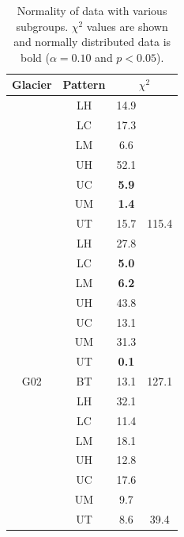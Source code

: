 \documentclass[12pt]{article}
\begin{document}
\begin{table}
\centering
\caption{Normality of data with various subgroups. $\chi^2$ values are shown and normally distributed data is bold ($\alpha=0.10$ and $p<0.05$).}
\label{tab:normality}
\begin{tabular}{cccc}
\textbf{Glacier} & \textbf{Pattern} & \multicolumn{2}{c}{\textbf{$\chi^2$}} \\ 
\hline
\hline
\rowcolor[HTML]{EFEFEF} 
\cellcolor[HTML]{EFEFEF} & LH & 14.9 & \cellcolor[HTML]{EFEFEF} \\
\rowcolor[HTML]{EFEFEF} 
\cellcolor[HTML]{EFEFEF} & LC & 17.3 & \cellcolor[HTML]{EFEFEF} \\
\rowcolor[HTML]{EFEFEF} 
\cellcolor[HTML]{EFEFEF} & LM & 6.6 & \cellcolor[HTML]{EFEFEF} \\
\rowcolor[HTML]{EFEFEF} 
\cellcolor[HTML]{EFEFEF} & UH & 52.1 & \cellcolor[HTML]{EFEFEF} \\
\rowcolor[HTML]{EFEFEF} 
\cellcolor[HTML]{EFEFEF} & UC & \textbf{5.9} & \cellcolor[HTML]{EFEFEF} \\
\rowcolor[HTML]{EFEFEF} 
\cellcolor[HTML]{EFEFEF} & UM & \textbf{1.4} & \cellcolor[HTML]{EFEFEF} \\
\rowcolor[HTML]{EFEFEF} 
\multirow{-7}{*}{\cellcolor[HTML]{EFEFEF}G04} & UT & 15.7 & \multirow{-7}{*}{\cellcolor[HTML]{EFEFEF}115.4} \\
 & LH & 27.8 &  \\
 & LC & \textbf{5.0} &  \\
 & LM & \textbf{6.2} &  \\
 & UH & 43.8 &  \\
 & UC & 13.1 &  \\
 & UM & 31.3 &  \\
 & UT & \textbf{0.1} &  \\
\multirow{-8}{*}{G02} & BT & 13.1 & \multirow{-8}{*}{127.1} \\
\rowcolor[HTML]{EFEFEF} 
\cellcolor[HTML]{EFEFEF} & LH & 32.1 & \cellcolor[HTML]{EFEFEF} \\
\rowcolor[HTML]{EFEFEF} 
\cellcolor[HTML]{EFEFEF} & LC & 11.4 & \cellcolor[HTML]{EFEFEF} \\
\rowcolor[HTML]{EFEFEF} 
\cellcolor[HTML]{EFEFEF} & LM & 18.1 & \cellcolor[HTML]{EFEFEF} \\
\rowcolor[HTML]{EFEFEF} 
\cellcolor[HTML]{EFEFEF} & UH & 12.8 & \cellcolor[HTML]{EFEFEF} \\
\rowcolor[HTML]{EFEFEF} 
\cellcolor[HTML]{EFEFEF} & UC & 17.6 & \cellcolor[HTML]{EFEFEF} \\
\rowcolor[HTML]{EFEFEF} 
\cellcolor[HTML]{EFEFEF} & UM & 9.7 & \cellcolor[HTML]{EFEFEF} \\
\rowcolor[HTML]{EFEFEF} 
\multirow{-7}{*}{\cellcolor[HTML]{EFEFEF}G13} & UT & 8.6 & \multirow{-7}{*}{\cellcolor[HTML]{EFEFEF}39.4}
\end{tabular}
\end{table}
\end{document}
